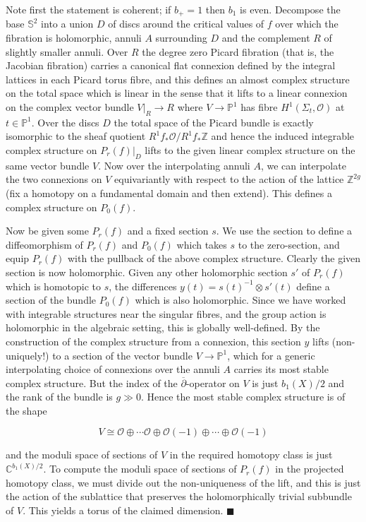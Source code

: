 \documentclass[10pt]{article}
\newcommand{\pp}{\mathbb{P}}
\newcommand{\cc}{\mathbb{C}}
\newcommand{\zz}{\mathbb{Z}}
\newcommand{\sss}{\mathbb{S}}
\newcommand{\cdbar}{\overline{\partial}}
\newenvironment{Pf}{\par \noindent{\sc Proof:} }{\quad $\blacksquare$ \par
\vspace{0.5cm}}
\begin{document}
\begin{Pf}
Note first the statement is coherent;  if $b_+=1$ then $b_1$ is even.
Decompose the base $\sss^2$ into a union $D$ of discs around the
critical values of $f$ over which the fibration is holomorphic, annuli
$A$ surrounding $D$ and the complement $R$ of slightly smaller annuli.
Over $R$ the degree zero Picard fibration (that is, the Jacobian
fibration) carries a canonical flat connexion
defined by the integral lattices in each Picard torus fibre, and this
defines an almost complex structure on the total space which is linear
in the sense that it lifts to a linear connexion on the complex vector bundle
$V|_R \rightarrow R$ where $V \rightarrow \pp^1$ has fibre $H^1
(\Sigma_t, \mathcal{O})$ at $t \in \pp^1$.  Over the discs $D$ the
total space of the Picard bundle is exactly isomorphic to the sheaf
quotient $R^1 f_* \mathcal{O} / R^1 f_* \zz$ and hence the induced
integrable complex structure on $P_r(f)|_D$ lifts to the given
linear complex structure on the same vector bundle $V$.  Now over the
interpolating annuli $A$, we can interpolate the two connexions on $V$
equivariantly with respect to the action of the lattice $\zz^{2g}$
(fix a homotopy on a fundamental domain and then extend).
This defines a complex structure on $P_0(f)$.

\vspace{0.2cm}

\noindent Now be given some $P_r(f)$ and a fixed section $s$.  We use
the section to define a diffeomorphism of $P_r(f)$ and $P_0(f)$ which
takes $s$ to the zero-section, and equip $P_r(f)$ with the pullback of
the above complex structure.  Clearly the given section is now
holomorphic.  Given any other holomorphic section $s'$ of
$P_r(f)$ which is homotopic to $s$, the differences $y(t) = s(t)^{-1} \otimes
s'(t)$ define a section of the bundle $P_0(f)$ which is also
holomorphic.  Since we have worked with integrable structures near the
singular fibres, and the group action is holomorphic in the algebraic
setting, this is globally well-defined.  By the construction of the
complex structure from a
connexion, this section $y$ lifts (non-uniquely!) to a section of the
vector bundle $V
\rightarrow \pp^1$, which for a generic interpolating choice of
connexions over the annuli $A$ carries its most stable complex
structure.  But the index of the $\cdbar$-operator on $V$ is just
$b_1(X)/2$ and the rank of the bundle is $g \gg 0$. Hence the most
stable complex structure is of the shape 

$$V \cong \mathcal{O} \oplus
\cdots \mathcal{O} \oplus \mathcal{O}(-1) \oplus \cdots \oplus
\mathcal{O}(-1)$$

\noindent and the moduli space of sections of $V$ in the required
homotopy class is just $\cc^{b_1(X)/2}$.  To compute the moduli space
of sections of $P_r(f)$ in the projected homotopy class, we must
divide out the non-uniqueness of the lift, and this is just the action
of the sublattice that preserves the holomorphically trivial subbundle of
$V$.  This yields a torus of the claimed dimension.
\end{Pf}
\end{document}

